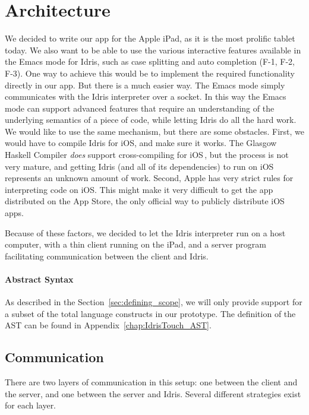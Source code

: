 \chapter{Architecture}
\label{sec:Architecture}

We decided to write our app for the Apple iPad, as it is the most prolific
tablet today. We also want to be able to use the various interactive features
available in the Emacs mode for Idris, such as case
splitting and auto completion (F-1, F-2, F-3). One way to achieve this would be to implement
the required functionality directly in our app. But there is a much easier way.
The Emacs mode simply communicates with the Idris interpreter over a socket. 
In this way the Emacs mode can support advanced features that require an
understanding of the underlying semantics of a piece of code, while letting
Idris do all the hard work. We would like to use the same mechanism, but there
are some obstacles. First, we would have to compile Idris for iOS, and make 
sure it works. The Glasgow Haskell Compiler \emph{does} support 
cross-compiling for iOS\,\cite{ghc_ios_crosscompiler}, but the process is not very mature, and
getting Idris (and all of its dependencies) to run on iOS represents an 
unknown amount of work. Second, Apple has very strict rules for interpreting
code on iOS\@. This might make it very difficult to get the app distributed on
the App Store, the only official way to publicly distribute iOS apps.

Because of these factors, we decided to let the Idris interpreter run on a 
host computer, with a thin client running on the iPad, and a server program 
facilitating communication between the client and Idris.

\subsubsection{Abstract Syntax}
\label{subsec:AbstractSyntax}
As described in the Section~\ref{sec:defining_scope}, we will only
provide support for a subset of the total language constructs in our prototype.
The definition of the AST can be found in Appendix~\ref{chap:IdrisTouch_AST}.


\section{Communication}
There are two layers of communication in this setup: one between the client and
the server, and one between the server and Idris. Several different strategies
exist for each layer. 

